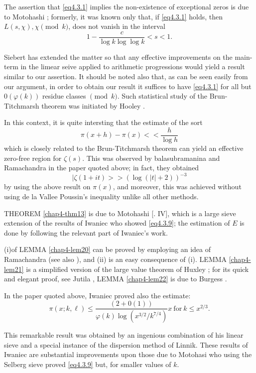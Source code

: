 The assertion that \eqref{eq4.3.1} implies the non-existence of exceptional
zeros is due to Motohashi \cite{key59}; formerly, it was known only that, if
\eqref{eq4.3.1} holds, then $L(s, \chi), \chi \pmod{k}$, does not vanish in
the interval  
$$
1- \frac{c}{\log k \log \log k}< s < 1. 
$$

Siebert\pageoriginale \cite{key78} has extended the matter so that any
effective improvements on the main-term in the limear seive applied to
arithmetic progressions would yield a result similar to our
assertion. It should be noted also that, as can be seen easily from
our argument, in order to obtain our result it suffices to have
\eqref{eq4.3.1} for all but $0(\varphi (k))$ residue classes $\pmod{k}$. Such
statistical study of the Brun-Titchmarsh theorem was initiated by
Hooley \cite{key24}. 

In this context, it is quite intersting that the estimate of the sort 
$$
\pi (x + h) - \pi (x)<< \frac{h}{\log h}
$$
which is closely related to the Brun-Titchmarsh theorem can yield an
effective zero-free region for $\zeta (s)$. This was observed by
balasubramanina and Ramachandra in the paper quoted above; in fact,
they obtained  
$$
| \zeta (1+ it) >> (\log(| t | + 2))^{-3}
$$
by using the above result on $\pi (x)$, and moreover, this was
achieved without using de la Vallee Poussin's inequality unlike all
other methods.  

THEOREM \ref{chap4-thm13}  is due to Motohashi [\cite{key54}. IV],
which is a large sieve 
extension of the results of Iwaniec \cite{key32} who showed
\eqref{eq4.3.9}; the estimation of $E$ is done by following the
relevant part of Iwaniec's work. 

(i)\pageoriginale of LEMMA \ref{chap4-lem20} can be proved by
employing an idea of Rama\-chandra 
\cite{key63} (see also \cite{key6}), and (ii) is an easy consequence
of (i). LEM\-MA \ref{chap4-lem21} is a simplified version of the large
value theorem of Huxley 
\cite{key26}; for its quick and elegant proof, see Jutila
\cite{key39}, LEMMA \ref{chap4-lem22} is due to Burgess \cite{key10}. 

In the paper quoted above, Iwaniec proved also the estimate:
$$
\pi(x; k, \ell ) \leq \frac{(2 + 0(1) )}{\varphi (k) \log (x^{3/2}/
  k^{7/4})}x ~\text{for}~ k \leq x^{2/3}. 
$$

This remarkable result was obtained by an ingenious combination of his
linear sieve and a special instance of the dispersion method of
Linnik. These results of  Iwaniec are substantial improvements upon
those due to Motohasi \cite{key52} who using the Selberg sieve proved
\eqref{eq4.3.9} but, for smaller values of $k$. 
